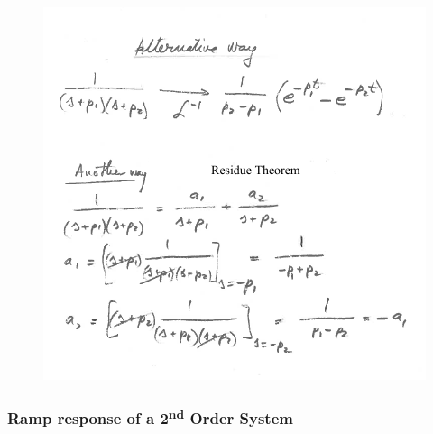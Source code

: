 \documentclass[12pt,letter]{article}
\begin{document}
\begin{mdframed}[middlelinewidth=0.5mm]
\begin{figure}[H]
		\includegraphics[width=5.5in]{../figures/x_t_time_response_2nd_order_impulse_proof_2}
	\end{figure}
\end{mdframed}

\subsubsection{Ramp response of a 2\textsuperscript{nd} Order System}
\end{document}
